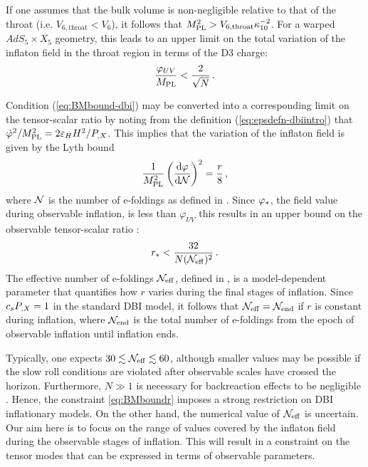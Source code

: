 If one assumes that the bulk volume is 
non-negligible relative to 
that of the throat (i.e. $V_{6,\mathrm{throat}} < V_{6}$), 
it follows that $M_{\mathrm{PL}}^2> V_{6,\mathrm{throat}}\kappa_{10}^{-2}$. 
For a warped $AdS_5 \times X_5$ geometry, this leads to an 
upper limit on the total variation of the inflaton field in 
the throat region in terms of the D3 charge:
% 
\begin{equation}
\label{eq:BMbound-dbi}
\frac{\varphi_{UV}}{M_{\mathrm{PL}}}   < \frac{2}{\sqrt{N}} \,.
\end{equation}
% 


Condition (\ref{eq:BMbound-dbi}) may be converted into a 
corresponding limit on the tensor-scalar ratio by noting from 
the definition (\ref{eq:epsdefn-dbiintro})
that $\dot{\varphi}^2 /M_{\mathrm{PL}}^2 = 2\varepsilon_H H^2/P_{,X}$.
This implies that the variation of the inflaton field 
is given by the Lyth bound  
\cite{lyth,bmpaper}
% 
\begin{equation}
\label{eq:rtheory}
\frac{1}{M_{\mathrm{PL}}^2} \left( \frac{\mathrm{d}\varphi}{\mathrm{d} \mathcal{N}} \right)^2 =
\frac{r}{8} \,,
\end{equation}
% 
where $\mathcal{N}$ is the number of e-foldings as defined in . 
Since $\varphi_*$, the field value during observable inflation,  is
less than $\varphi_{UV}$
this results in an upper bound on the observable tensor-scalar ratio
\cite{bmpaper}: 
% 
\begin{equation}
\label{eq:BMboundr}
r_*  < \frac{32}{N (\mathcal{N}_\mathrm{eff})^2} \,.
\end{equation}
% 
The effective number of e-foldings $\mathcal{N}_\mathrm{eff}$, defined in
, 
is a model-dependent parameter that quantifies 
how $r$ varies during the final stages of inflation. Since $c_sP_{,X} = 1$ in the
standard DBI model, 
it follows that $\mathcal{N}_\mathrm{eff} = \mathcal{N}_\mathrm{end}$ if $r$ is constant during inflation,
where $\mathcal{N}_\mathrm{end}$ is the total number of e-foldings
from the epoch of observable inflation until inflation ends.


Typically, one expects $30 \lesssim {\ensuremath{\mathcal{N}_\mathrm{eff}}} \lesssim 60$, 
although smaller values may be possible if the slow roll conditions are 
violated after observable scales have crossed the horizon. 
Furthermore, $N \gg 1$ is necessary 
for backreaction effects to be negligible \cite{bmpaper}. 
Hence, the constraint \eqref{eq:BMboundr} 
imposes a strong restriction on DBI inflationary models. 
On the other hand, the numerical value 
of $\mathcal{N}_\mathrm{eff}$ is uncertain.  
Our aim here is to focus on the range of values covered by the 
inflaton field during the observable stages of inflation. 
This will result in a constraint on the tensor modes that 
can be expressed in terms of observable parameters.  


